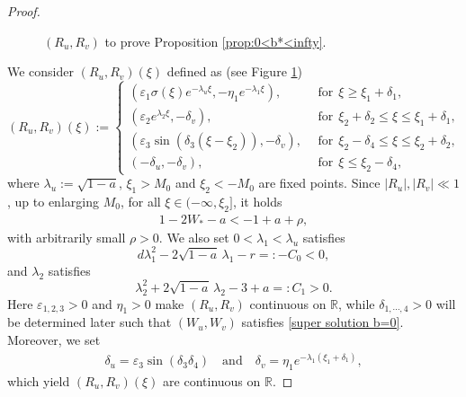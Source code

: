 \documentclass[11pt,a4paper]{article}
\numberwithin{equation}{section}
\numberwithin{figure}{section}
\newcommand\bea{\begin{eqnarray}}
\newcommand\eea{\end{eqnarray}}
\begin{document}
\begin{proof}
\begin{figure}
\begin{center}
\caption{$(R_u,R_v)$ to prove Proposition \ref{prop:0<b*<infty}.}\label{Figure prop}
\end{center}
\end{figure}


We consider $(R_u,R_v)(\xi)$ defined  as (see Figure \ref{Figure prop})
\begin{equation*}
(R_u,R_v)(\xi):=\begin{cases}
(\varepsilon_1\sigma(\xi) e^{-\lambda_u\xi},-\eta_1 e^{-\lambda_1\xi}),&\ \ \mbox{for}\ \ \xi\ge\xi_1+\delta_1,\\
(\varepsilon_2e^{\lambda_2\xi},-\delta_v),&\ \ \mbox{for}\ \ \xi_2+\delta_2\le\xi\le\xi_1+\delta_1,\\
(\varepsilon_3\sin(\delta_3(\xi-\xi_2)),-\delta_v),&\ \ \mbox{for}\ \ \xi_2-\delta_4\le\xi\le\xi_{2}+\delta_2,\\
(-\delta_u,-\delta_v),&\ \ \mbox{for}\ \ \xi\le\xi_2-\delta_4,
\end{cases}
\end{equation*}
where $\lambda_u:=\sqrt{1-a}$, $\xi_1>M_0$ and $\xi_2<-M_0$ are fixed points. Since $|R_u|,|R_v|\ll 1$, up to enlarging $M_0$, for all $\xi\in(-\infty,\xi_2]$, it holds
\bea\label{xi 2 b=0}
1-2W_*-a<-1+a+\rho,
\eea
with arbitrarily small $\rho>0$. We also set $0<\lambda_{1}<\lambda_u$ satisfies
\begin{equation}\label{condition on lambda 1 b=0}
d\lambda_1^2-2\sqrt{1-a}\,\lambda_1-r=:-C_0<0,
\end{equation}
and $\lambda_{2}$ satisfies
\begin{equation}\label{condition on lambda 2 b=0}
\lambda_2^2+2\sqrt{1-a}\,\lambda_2-3+a=:C_1>0.
\end{equation}
Here
$\varepsilon_{1,2,3}>0$ and $\eta_1>0$ make $(R_u,R_v)$ continuous on $\mathbb{R}$, while $\delta_{1,\cdots,4}>0$ will be determined later such that $(W_u,W_v)$ satisfies \eqref{super solution b=0}.  Moreover, we set
\bea\label{delta u v b=0}
\delta_u=\varepsilon_3\sin(\delta_3\delta_4)\quad\text{and}\quad \delta_v=\eta_1e^{-\lambda_1(\xi_1+\delta_1)},
\eea
which yield $(R_u,R_v)(\xi)$ are continuous on $\mathbb{R}$.


\end{proof}
\end{document}
